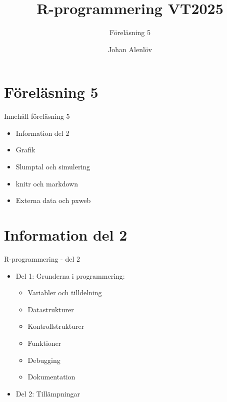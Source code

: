 \documentclass[
  11pt,
  ignorenonframetext,
  handout]{beamer}
\title{R-programmering VT2025}
\subtitle{Föreläsning 5}
\author{Johan Alenlöv}
\date{}
\institute{Linköpings Universitet}
\providecommand{\tightlist}{%
  \setlength{\itemsep}{0pt}\setlength{\parskip}{0pt}}
\begin{document}
\frame{\titlepage}

\section{Föreläsning 5}\label{fuxf6reluxe4sning-5}

\begin{frame}{Innehåll föreläsning 5}
\label{innehuxe5ll-fuxf6reluxe4sning-5}
\begin{itemize}
\tightlist
\item
  Information del 2
\item
  Grafik
\item
  Slumptal och simulering
\item
  knitr och markdown
\item
  Externa data och pxweb
\end{itemize}
\end{frame}

\section{Information del 2}\label{information-del-2}

\begin{frame}{R-programmering - del 2}
\label{r-programmering---del-2}
\begin{itemize}
\tightlist
\item
  Del 1: Grunderna i programmering:

  \begin{itemize}
  \tightlist
  \item
    Variabler och tilldelning
  \item
    Datastrukturer
  \item
    Kontrollstrukturer
  \item
    Funktioner
  \item
    Debugging
  \item
    Dokumentation
  \end{itemize}
\item
  Del 2: Tillämpningar
\end{itemize}
\end{frame}
\end{document}
